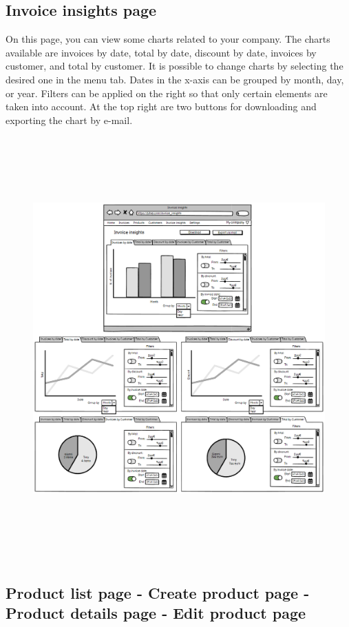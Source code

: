 \newpage
\subsection{Invoice insights page}
On this page, you can view some charts related to your company. The charts available are invoices by date, total by date, discount by date, invoices by customer, and total by customer. It is possible to change charts by selecting the desired one in the menu tab. Dates in the x-axis can be grouped by month, day, or year. Filters can be applied on the right so that only certain elements are taken into account. At the top right are two buttons for downloading and exporting the chart by e-mail.
\begin{figure}[h!]
    \centering
    \includegraphics[height=460pt, keepaspectratio]{resources/mockup/Invoice_insights.png}
\end{figure}


\newpage
\subsection{Product list page - Create product page - Product details page - Edit product page}

